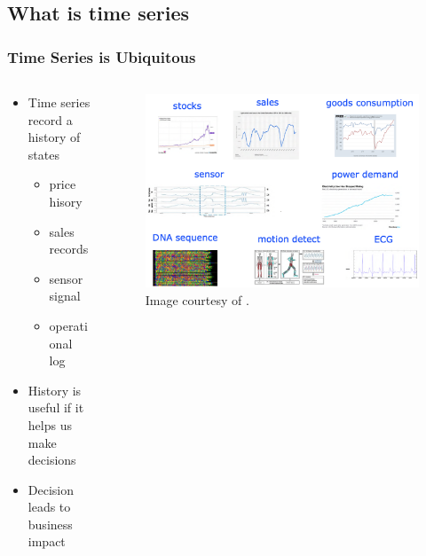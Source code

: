 \documentclass[aspectratio=169,xcolor=x11names,table]{beamer}
\begin{document}
\subsection{What is time series}
\begin{frame}
	\frametitle{Time Series is Ubiquitous}
	\begin{columns}
		\begin{column}{0.4\linewidth}
			\begin{itemize}
				\item Time series record a history of states
					\begin{itemize}
						\item price hisory
						\item sales records
						\item sensor signal
						\item operational log
					\end{itemize}
				\item History is useful if it helps us make decisions
				\item Decision leads to business impact
			\end{itemize}
		\end{column}
		\hfill
		\begin{column}{0.6\linewidth}
			\begin{figure}
				\centering
				\includegraphics[width=\columnwidth]{time_series}
				\tiny{Image courtesy of \cite{wen2022robust}.}
			\end{figure}
		\end{column}
	\end{columns}
\end{frame}
\end{document}
